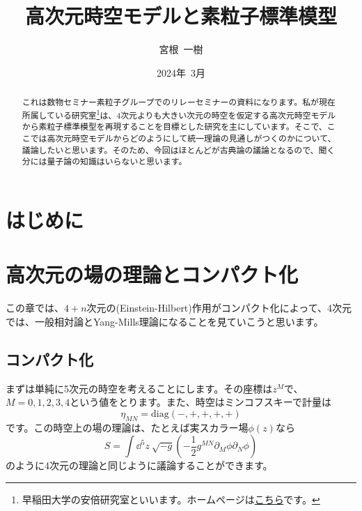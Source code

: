 \documentclass[unicode,a4paper,10pt,ja=standard,lualatex]{bxjsarticle}
\title{高次元時空モデルと素粒子標準模型}
\author{宮根\ 一樹}
\date{2024年\ 3月}
\begin{document}
\maketitle

\begin{abstract}
   これは数物セミナー素粒子グループでのリレーセミナーの資料になります。私が現在所属している研究室\footnote{
      早稲田大学の安倍研究室といいます。ホームページは\href{http://www.hep.phys.waseda.ac.jp/index-j.html}{こちら}です。
   }は、4次元よりも大きい次元の時空を仮定する高次元時空モデルから素粒子標準模型を再現することを目標とした研究を主にしています。そこで、ここでは高次元時空モデルからどのようにして統一理論の見通しがつくのかについて、議論したいと思います。そのため、今回はほとんどが古典論の議論となるので、聞く分には量子論の知識はいらないと思います。
\end{abstract}

\tableofcontents

\clearpage

\section{はじめに}


\clearpage

\section{高次元の場の理論とコンパクト化}

この章では、$4+n$次元の(Einstein-Hilbert)作用がコンパクト化によって、4次元では、一般相対論とYang-Mills理論になることを見ていこうと思います。


\subsection{コンパクト化}

まずは単純に5次元の時空を考えることにします。その座標は$z^{M}$で、$M=0,1,2,3,4$という値をとります。また、時空はミンコフスキーで計量は
\begin{equation}
   \eta_{MN}
   =
   \text{diag}(-,+,+,+,+)
\end{equation}
です。この時空上の場の理論は、たとえば実スカラー場$\phi(z)$なら
\begin{equation}
   S
   =
   \int\dd^5 z\ \sqrt{-g}
   \left(  
      -\frac{1}{2}
      g^{MN}\partial_{M}\phi\partial_{N}\phi
   \right)
   \label{eqn:action_5d_real_scalar}
\end{equation}
のように4次元の理論と同じように議論することができます。
\end{document}
